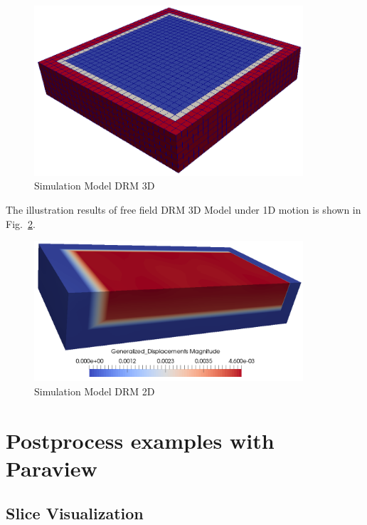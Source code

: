 \begin{figure}[H]
  \centering
  \includegraphics[width = 10cm]{./Figure-files/Day1/Preprocess_examples_with_Gmsh/example4/overview.png}
  \caption{Simulation Model DRM 3D}
  \label{fig_gmsh_ex4}
\end{figure}

The illustration results of free field DRM 3D Model under 1D motion is shown 
in Fig.~\ref{fig_day1_DRM3D_results}. 

\begin{figure}[H]
  \centering
  \includegraphics[width = 10cm]{./Figure-files/Day1/Preprocess_examples_with_Gmsh/example4/DRM3D_results.png}
  \caption{Simulation Model DRM 2D}
  \label{fig_day1_DRM3D_results}
\end{figure}


\clearpage
\newpage
\section{Postprocess examples with Paraview}
\label{Postprocess_examples_with_Paraview}
\subsection{Slice Visualization}

